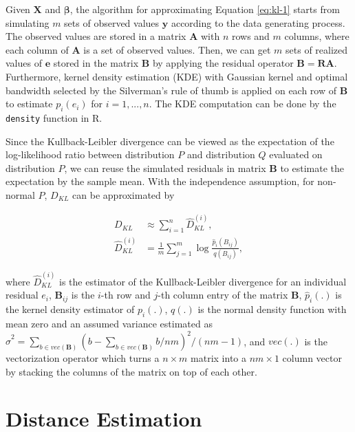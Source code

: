 \documentclass[]{interact}
\theoremstyle{plain}%
\theoremstyle{definition}
\theoremstyle{remark}
\begin{document}
Given \(\boldsymbol{X}\) and \(\boldsymbol{\beta}\), the algorithm for
approximating Equation \ref{eq:kl-1} starts from simulating \(m\) sets
of observed values \(\boldsymbol{y}\) according to the data generating
process. The observed values are stored in a matrix \(\boldsymbol{A}\)
with \(n\) rows and \(m\) columns, where each column of
\(\boldsymbol{A}\) is a set of observed values. Then, we can get \(m\)
sets of realized values of \(\boldsymbol{e}\) stored in the matrix
\(\boldsymbol{B}\) by applying the residual operator
\(\boldsymbol{B} = \boldsymbol{R}\boldsymbol{A}\). Furthermore, kernel
density estimation (KDE) with Gaussian kernel and optimal bandwidth
selected by the Silverman's rule of thumb \citep{silverman2018density}
is applied on each row of \(\boldsymbol{B}\) to estimate \(p_i(e_i)\)
for \(i = 1, ..., n\). The KDE computation can be done by the
\texttt{density} function in R.

Since the Kullback-Leibler divergence can be viewed as the expectation
of the log-likelihood ratio between distribution \(P\) and distribution
\(Q\) evaluated on distribution \(P\), we can reuse the simulated
residuals in matrix \(\boldsymbol{B}\) to estimate the expectation by
the sample mean. With the independence assumption, for non-normal \(P\),
\(D_{KL}\) can be approximated by

\begin{align*} \label{eq:kl-3}
D_{KL} &\approx \sum_{i = 1}^{n} \hat{D}_{KL}^{(i)}, \\
\hat{D}_{KL}^{(i)} &= \frac{1}{m}\sum_{j = 1}^{m} \log\frac{\hat{p}_i(B_{ij})}{q(B_{ij})},
\end{align*}

\noindent where \(\hat{D}_{KL}^{(i)}\) is the estimator of the
Kullback-Leibler divergence for an individual residual \(e_i\),
\(\boldsymbol{B}_{ij}\) is the \(i\)-th row and \(j\)-th column entry of
the matrix \(\boldsymbol{B}\), \(\hat{p}_i(.)\) is the kernel density
estimator of \(p_i(.)\), \(q(.)\) is the normal density function with
mean zero and an assumed variance estimated as
\(\hat{\sigma}^2 = \sum_{b \in vec(\boldsymbol{B})}(b - \sum_{b \in vec(\boldsymbol{B})} b/nm)^2/(nm - 1)\),
and \(vec(.)\) is the vectorization operator which turns a
\(n \times m\) matrix into a \(nm \times 1\) column vector by stacking
the columns of the matrix on top of each other.

\section{Distance Estimation}\label{sec-model-distance-estimation}
\end{document}

